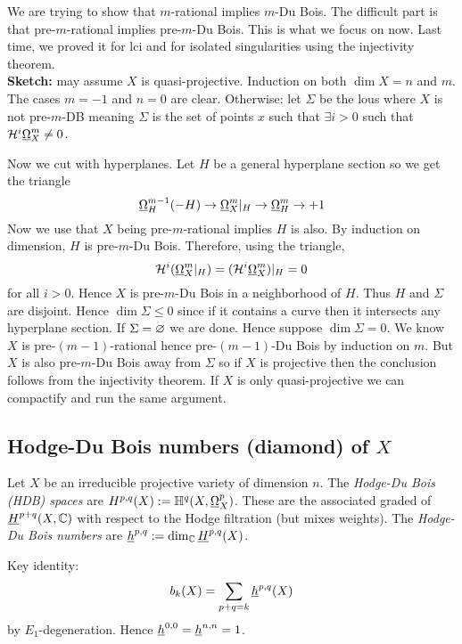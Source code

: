 \documentclass[12pt]{article}
\newcommand{\HH}{\mathbb{H}}
\renewcommand{\cH}{\mathcal{H}}
\begin{document}
We are trying to show that $m$-rational implies $m$-Du Bois. The difficult part is that pre-$m$-rational implies pre-$m$-Du Bois. This is what we focus on now. Last time, we proved it for lci and for isolated singularities using the injectivity theorem. 
\bigskip\\
\textbf{Sketch:} may assume $X$ is quasi-projective. Induction on both $\dim{X} = n$ and $m$. The cases $m = - 1$ and $n = 0$ are clear. Otherwise: let $\Sigma$ be the lous where $X$ is not pre-$m$-DB meaning $\Sigma$ is the set of points $x$ such that $\exists i > 0$ such that $\cH^i \ulO_X^m \neq 0$. 
\par 
Now we cut with hyperplanes. Let $H$ be a general hyperplane section so we get the triangle
\[ \underline{\Omega}_H^{m-1}(-H) \to \underline{\Omega}_X^m|_H \to \underline{\Omega}_H^m \to +1 \]
Now we use that $X$ being pre-$m$-rational implies $H$ is also. By induction on dimension, $H$ is pre-$m$-Du Bois. Therefore, using the triangle,
\[ \cH^i(\ulO_X^m|_H) = (\cH^i \ulO_X^m)|_H = 0 \]
for all $i > 0$. Hence $X$ is pre-$m$-Du Bois in a neighborhood of $H$. Thus $H$ and $\Sigma$ are disjoint. Hence $\dim{\Sigma} \le 0$ since if it contains a curve then it intersects any hyperplane section. If $\Sigma = \varnothing$ we are done. Hence suppose $\dim{\Sigma} = 0$. We know $X$ is pre-$(m-1)$-rational hence pre-$(m-1)$-Du Bois by induction on $m$. But $X$ is also pre-$m$-Du Bois away from $\Sigma$ so if $X$ is projective then the conclusion follows from the injectivity theorem. If $X$ is only quasi-projective we can compactify and run the same argument.  


\subsection{Hodge-Du Bois numbers (diamond) of $X$}

\newcommand{\ulh}{\ul{h}}
\newcommand{\sn}{\mathrm{sn}}

\begin{defn}
Let $X$ be an irreducible projective variety of dimension $n$. The \textit{Hodge-Du Bois (HDB) spaces} are $H^{p,q}(X) := \HH^q(X, \ulO_X^p)$. These are the associated graded of $\underline{H}^{p+q}(X, \mathbb{C})$ with respect to the Hodge filtration (but mixes weights). The \textit{Hodge-Du Bois numbers} are $\ulh^{p,q} := \dim_{\CC} \ul{H}^{p,q}(X)$. 
\end{defn}

Key identity:
\[ b_k(X) = \sum_{p+q = k} \ulh^{p,q}(X) \]
by $E_1$-degeneration. Hence $\ulh^{0,0} = \ulh^{n,n} = 1$. 
\end{document}
